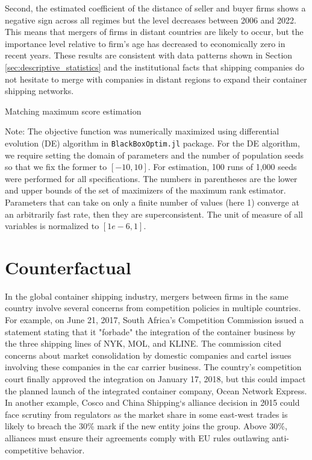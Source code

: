 \documentclass[10pt]{article}
\begin{document}
Second, the estimated coefficient of the distance of seller and buyer firms shows a negative sign across all regimes but the level decreases between 2006 and 2022. 
This means that mergers of firms in distant countries are likely to occur, but the importance level relative to firm's age has decreased to economically zero in recent years.
These results are consistent with data patterns shown in Section \ref{sec:descriptive_statistics} and the institutional facts that shipping companies do not hesitate to merge with companies in distant regions to expand their container shipping networks.

\begin{table}[!htbp]
  \begin{center}
      \caption{Matching maximum score estimation}
      \label{tb:maximum_score_estimate} 
      
  \end{center}\footnotesize
  Note: The objective function was numerically maximized using differential evolution (DE) algorithm in \texttt{BlackBoxOptim.jl} package. For the DE algorithm, we require setting the domain of parameters and the number of population seeds so that we fix the former to $[-10, 10]$. For estimation, 100 runs of 1,000 seeds were performed for all specifications. The numbers in parentheses are the lower and upper bounds of the set of maximizers of the maximum rank estimator. Parameters that can take on only a finite number of values (here 1) converge at an arbitrarily fast rate, then they are superconsistent. The unit of measure of all variables is normalized to $[1e-6,1]$. 
\end{table} 

\section{Counterfactual}\label{sec:counterfactuals}

In the global container shipping industry, mergers between firms in the same country involve several concerns from competition policies in multiple countries.
For example, on June 21, 2017, South Africa's Competition Commission issued a statement stating that it "forbade" the integration of the container business by the three shipping lines of NYK, MOL, and KLINE. 
The commission cited concerns about market consolidation by domestic companies and cartel issues involving these companies in the car carrier business.
The country's competition court finally approved the integration on January 17, 2018, but this could impact the planned launch of the integrated container company, Ocean Network Express. 
In another example, Cosco and China Shipping`s alliance decision in 2015 could face scrutiny from regulators as the market share in some east-west trades is likely to breach the 30\% mark if the new entity joins the group. Above 30\%, alliances must ensure their agreements comply with EU rules outlawing anti-competitive behavior.
\end{document}
